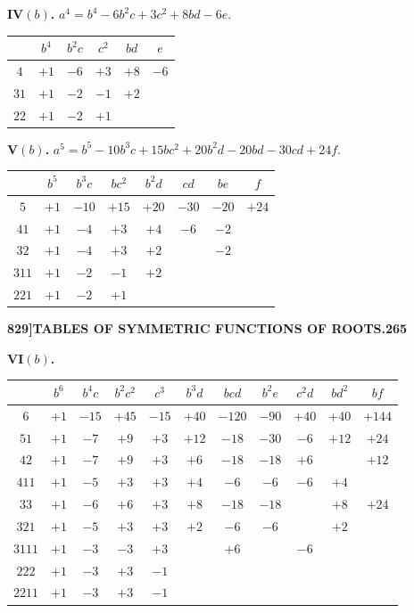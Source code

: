 \documentclass[12pt,a4paper]{article}
\theoremstyle{definition}
\begin{document}
\medskip

\noindent\textbf{IV$(b)$.} $a^4 = b^4 - 6b^2c + 3c^2 + 8bd - 6e$.
\begin{center}
\begin{tabular}{c|c|c|c|c|c}
& $b^4$ & $b^2c$ & $c^2$ & $bd$ & $e$ \\
\hline
$4$ & $+1$ & $-6$ & $+3$ & $+8$ & $-6$ \\
$31$ & $+1$ & $-2$ & $-1$ & $+2$ & \\
$22$ & $+1$ & $-2$ & $+1$ & &
\end{tabular}
\end{center}

\medskip

\noindent\textbf{V$(b)$.} $a^5 = b^5 - 10b^3c + 15bc^2 + 20b^2d - 20bd - 30cd + 24f$.
\begin{center}
\begin{tabular}{c|c|c|c|c|c|c|c}
& $b^5$ & $b^3c$ & $bc^2$ & $b^2d$ & $cd$ & $be$ & $f$ \\
\hline
$5$ & $+1$ & $-10$ & $+15$ & $+20$ & $-30$ & $-20$ & $+24$ \\
$41$ & $+1$ & $-4$ & $+3$ & $+4$ & $-6$ & $-2$ & \\
$32$ & $+1$ & $-4$ & $+3$ & $+2$ & & $-2$ & \\
$311$ & $+1$ & $-2$ & $-1$ & $+2$ & & & \\
$221$ & $+1$ & $-2$ & $+1$ & & & &
\end{tabular}
\end{center}

\newpage
\setcounter{page}{265}

\noindent\textbf{829]}\hfill\textbf{TABLES OF SYMMETRIC FUNCTIONS OF ROOTS.}\hfill\textbf{265}

\bigskip

\noindent\textbf{VI$(b)$.}
\begin{center}
\begin{tabular}{c|c|c|c|c|c|c|c|c|c|c}
& $b^6$ & $b^4c$ & $b^2c^2$ & $c^3$ & $b^3d$ & $bcd$ & $b^2e$ & $c^2d$ & $bd^2$ & $bf$ \\
\hline
$6$ & $+1$ & $-15$ & $+45$ & $-15$ & $+40$ & $-120$ & $-90$ & $+40$ & $+40$ & $+144$ \\
$51$ & $+1$ & $-7$ & $+9$ & $+3$ & $+12$ & $-18$ & $-30$ & $-6$ & $+12$ & $+24$ \\
$42$ & $+1$ & $-7$ & $+9$ & $+3$ & $+6$ & $-18$ & $-18$ & $+6$ & & $+12$ \\
$411$ & $+1$ & $-5$ & $+3$ & $+3$ & $+4$ & $-6$ & $-6$ & $-6$ & $+4$ & \\
$33$ & $+1$ & $-6$ & $+6$ & $+3$ & $+8$ & $-18$ & $-18$ & & $+8$ & $+24$ \\
$321$ & $+1$ & $-5$ & $+3$ & $+3$ & $+2$ & $-6$ & $-6$ & & $+2$ & \\
$3111$ & $+1$ & $-3$ & $-3$ & $+3$ & & $+6$ & & $-6$ & & \\
$222$ & $+1$ & $-3$ & $+3$ & $-1$ & & & & & & \\
$2211$ & $+1$ & $-3$ & $+3$ & $-1$ & & & & & &
\end{tabular}
\end{center}
\end{document}
